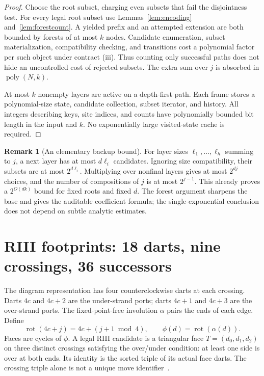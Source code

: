 \documentclass[11pt]{article}
\theoremstyle{definition}
\newtheorem{remark}[theorem]{Remark}
\newcommand{\poly}{\operatorname{poly}}
\begin{document}
\begin{proof}
Choose the root subset, charging even subsets that fail the disjointness
test. For every legal root subset use Lemmas~\ref{lem:encoding}
and~\ref{lem:forestcount}. A yielded prefix and an attempted extension are
both bounded by forests of at most $k$ nodes. Candidate enumeration,
subset materialization, compatibility checking, and transitions cost a
polynomial factor per such object under contract (iii). Thus counting only
successful paths does not hide an uncontrolled cost of rejected subsets.
The extra sum over $j$ is absorbed in $\poly(N,k)$.

At most $k$ nonempty layers are active on a depth-first path. Each frame
stores a polynomial-size state, candidate collection, subset iterator, and
history. All integers describing keys, site indices, and counts have
polynomially bounded bit length in the input and $k$. No exponentially
large visited-state cache is required.
\end{proof}

\begin{remark}[An elementary backup bound]
For layer sizes $\ell_1,\ldots,\ell_h$ summing to $j$, a next layer has at
most $d\ell_i$ candidates. Ignoring size compatibility, their subsets are
at most $2^{d\ell_i}$. Multiplying over nonfinal layers gives at most
$2^{dj}$ choices, and the number of compositions of $j$ is at most
$2^{j-1}$. This already proves a $2^{O(dk)}$ bound for fixed roots and
fixed $d$. The forest argument sharpens the base and gives the auditable
coefficient formula; the single-exponential conclusion does not depend on
subtle analytic estimates.
\end{remark}

\section{RIII footprints: 18 darts, nine crossings, 36 successors}
\label{sec:darts}

The diagram representation has four counterclockwise darts at each crossing.
Darts $4c$ and $4c+2$ are the under-strand ports; darts $4c+1$ and $4c+3$
are the over-strand ports. The fixed-point-free involution $\alpha$ pairs
the ends of each edge. Define
\[
 \operatorname{rot}(4c+j)=4c+(j+1\bmod4),\qquad
 \phi(d)=\operatorname{rot}(\alpha(d)).
\]
Faces are cycles of $\phi$. A legal RIII candidate is a triangular face
$T=(d_0,d_1,d_2)$ on three distinct crossings satisfying the over/under
condition: at least one side is over at both ends. Its identity is the
sorted triple of its actual face darts. The crossing triple alone is not
a unique move identifier~\cite{repo-simplify,repo-causal}.
\end{document}
